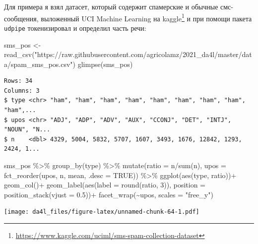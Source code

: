 \documentclass[
]{book}
\newenvironment{Shaded}{\begin{snugshade}}{\end{snugshade}}
\newcommand{\AttributeTok}[1]{\textcolor[rgb]{0.77,0.63,0.00}{#1}}
\newcommand{\ConstantTok}[1]{\textcolor[rgb]{0.00,0.00,0.00}{#1}}
\newcommand{\DecValTok}[1]{\textcolor[rgb]{0.00,0.00,0.81}{#1}}
\newcommand{\FloatTok}[1]{\textcolor[rgb]{0.00,0.00,0.81}{#1}}
\newcommand{\FunctionTok}[1]{\textcolor[rgb]{0.00,0.00,0.00}{#1}}
\newcommand{\NormalTok}[1]{#1}
\newcommand{\OtherTok}[1]{\textcolor[rgb]{0.56,0.35,0.01}{#1}}
\newcommand{\SpecialCharTok}[1]{\textcolor[rgb]{0.00,0.00,0.00}{#1}}
\newcommand{\StringTok}[1]{\textcolor[rgb]{0.31,0.60,0.02}{#1}}
\renewcommand{\href}[2]{#2\footnote{\url{#1}}}
\begin{document}
Для примера я взял датасет, который содержит спамерские и обычные смс-сообщения, выложенный UCI Machine Learning \href{https://www.kaggle.com/uciml/sms-spam-collection-dataset}{на kaggle} и при помощи пакета \texttt{udpipe} токенизировал и определил часть речи:

\begin{Shaded}
\begin{Highlighting}[]
\NormalTok{sms\_pos }\OtherTok{\textless{}{-}} \FunctionTok{read\_csv}\NormalTok{(}\StringTok{"https://raw.githubusercontent.com/agricolamz/2021\_da4l/master/data/spam\_sms\_pos.csv"}\NormalTok{)}
\FunctionTok{glimpse}\NormalTok{(sms\_pos)}
\end{Highlighting}
\end{Shaded}

\begin{verbatim}
Rows: 34
Columns: 3
$ type <chr> "ham", "ham", "ham", "ham", "ham", "ham", "ham", "ham", "ham",...
$ upos <chr> "ADJ", "ADP", "ADV", "AUX", "CCONJ", "DET", "INTJ", "NOUN", "N...
$ n    <dbl> 4329, 5004, 5832, 5707, 1607, 3493, 1676, 12842, 1293, 2424, 1...
\end{verbatim}

\begin{Shaded}
\begin{Highlighting}[]
\NormalTok{sms\_pos }\SpecialCharTok{\%\textgreater{}\%} 
  \FunctionTok{group\_by}\NormalTok{(type) }\SpecialCharTok{\%\textgreater{}\%} 
  \FunctionTok{mutate}\NormalTok{(}\AttributeTok{ratio =}\NormalTok{ n}\SpecialCharTok{/}\FunctionTok{sum}\NormalTok{(n),}
         \AttributeTok{upos =} \FunctionTok{fct\_reorder}\NormalTok{(upos, n, mean, }\AttributeTok{.desc =} \ConstantTok{TRUE}\NormalTok{)) }\SpecialCharTok{\%\textgreater{}\%}
  \FunctionTok{ggplot}\NormalTok{(}\FunctionTok{aes}\NormalTok{(type, ratio))}\SpecialCharTok{+}
  \FunctionTok{geom\_col}\NormalTok{()}\SpecialCharTok{+}
  \FunctionTok{geom\_label}\NormalTok{(}\FunctionTok{aes}\NormalTok{(}\AttributeTok{label =} \FunctionTok{round}\NormalTok{(ratio, }\DecValTok{3}\NormalTok{)), }\AttributeTok{position =} \FunctionTok{position\_stack}\NormalTok{(}\AttributeTok{vjust =} \FloatTok{0.5}\NormalTok{))}\SpecialCharTok{+}
  \FunctionTok{facet\_wrap}\NormalTok{(}\SpecialCharTok{\textasciitilde{}}\NormalTok{upos, }\AttributeTok{scales =} \StringTok{"free\_y"}\NormalTok{)}
\end{Highlighting}
\end{Shaded}

\texttt{[image: da4l\_files/figure-latex/unnamed-chunk-64-1.pdf]}
\end{document}
